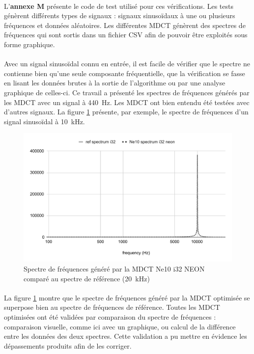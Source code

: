 \documentclass{article}
\begin{document}
    \paragraph{}
    L'\textbf{annexe M} présente le code de test utilisé pour ces vérifications. Les tests génèrent différents types de signaux : signaux sinusoïdaux à une ou plusieurs fréquences et données aléatoires. Les différentes MDCT génèrent des spectres de fréquences qui sont sortis dans un fichier CSV afin de pouvoir être exploités sous forme graphique.

    \paragraph{}
    Avec un signal sinusoïdal connu en entrée, il est facile de vérifier que le spectre ne contienne bien qu'une seule composante fréquentielle, que la vérification se fasse en lisant les données brutes à la sortie de l'algorithme ou par une analyse graphique de celles-ci. Ce travail a présenté les spectres de fréquences générés par les MDCT avec un signal à \SI{440}{\hertz}. Les MDCT ont bien entendu été testées avec d'autres signaux. La figure \ref{fig:validation_ne10_i32_neon_10k} présente, par exemple, le spectre de fréquences d'un signal sinusoïdal à \SI{10}{\kilo\hertz}.
    \begin{figure}[H]
        \centering
        \includegraphics[width=.8\linewidth]{./images/validation_ne10_i32_neon_10k.pdf}
        \caption{Spectre de fréquences généré par la MDCT Ne10 i32 NEON comparé au spectre de référence (\SI{20}{\kilo\hertz})}
        \label{fig:validation_ne10_i32_neon_10k}
    \end{figure}

    \paragraph{}
    La figure \ref{fig:validation_ne10_i32_neon_10k} montre que le spectre de fréquences généré par la MDCT optimisée se superpose bien au spectre de fréquences de référence. Toutes les MDCT optimisées ont été validées par comparaison du spectre de fréquences : comparaison visuelle, comme ici avec un graphique, ou calcul de la différence entre les données des deux spectres. Cette validation a pu mettre en évidence les dépassements produits afin de les corriger.
\end{document}

